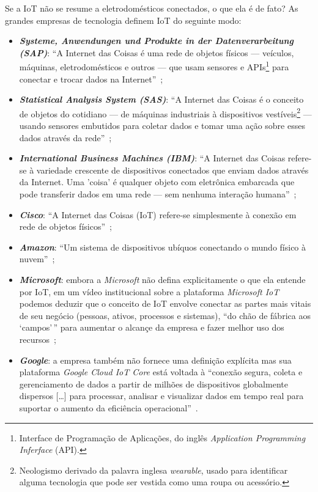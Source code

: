 \documentclass[pdftex, brazil, 12pt, twoside]{article}
\newcommand{\ingles}[1]{\textit{#1}}
\begin{document}
Se a IoT não se resume a eletrodomésticos conectados, o que ela é de fato? As
grandes empresas de tecnologia definem IoT do seguinte modo:

\begin{itemize}
\item \emph{\textbf{Systeme, Anwendungen und Produkte in der Datenverarbeitung (SAP)}}:
  ``A Internet das Coisas é uma rede de objetos físicos --- veículos,
  máquinas, eletrodomésticos e outros --- que usam sensores e APIs\footnote{%
    Interface de Programação de Aplicações, do inglês \ingles{Application Programming
    Inferface} (API).}
  para conectar e trocar dados na Internet''~\citep{SAPWhatIoT};
\item \emph{\textbf{Statistical Analysis System (SAS)}}: ``A Internet das Coisas é o
  conceito de objetos do cotidiano --- de
  máquinas industriais à dispositivos vestíveis\footnote{%
    Neologismo derivado da palavra inglesa \ingles{wearable}, usado para identificar
    alguma tecnologia que pode ser vestida como uma roupa ou acessório.}
  --- usando sensores embutidos para coletar
  dados e tomar uma ação sobre esses dados através da rede''~\citep{SASWhatIoT};
\item \emph{\textbf{International Business Machines (IBM)}}: ``A Internet das Coisas
  refere-se à variedade crescente
  de dispositivos conectados que enviam dados através da Internet. Uma 'coisa' é qualquer
  objeto com eletrônica embarcada que pode transferir dados em uma rede --- sem nenhuma
  interação humana''~\citep{IBMWhatIsIoT,IBMWhatsonIoT};
\item \emph{\textbf{Cisco}}: ``A Internet das Coisas (IoT) refere-se simplesmente à conexão
  em rede de objetos físicos''~\citep{CiscoIoTVS2013};
\item \emph{\textbf{Amazon}}: ``Um sistema de dispositivos ubíquos conectando o mundo
  físico à nuvem''~\citep{AmazonIoT};
\item \emph{\textbf{Microsoft}}: embora a \ingles{Microsoft} não defina explicitamente o que
  ela entende por IoT, em um vídeo institucional sobre a plataforma \emph{Microsoft IoT}
  podemos deduzir que o conceito de IoT envolve conectar as partes mais vitais de
  seu negócio (pessoas, ativos, processos e sistemas), ``do chão de fábrica aos `campos'\,''
  para aumentar o alcançe da empresa e fazer melhor uso dos recursos~\citep{MicrosoftIoT};
\item \emph{\textbf{Google}}: a empresa também não fornece uma definição explícita mas
  sua plataforma \emph{Google Cloud IoT Core} está voltada à ``conexão segura, coleta e
  gerenciamento de dados a partir de milhões de dispositivos globalmente dispersos [\ldots]
  para processar, analisar e visualizar dados em tempo real para suportar o aumento
  da eficiência operacional''~\citep{GoogleWhatsIoT}.
\end{itemize}
\end{document}
